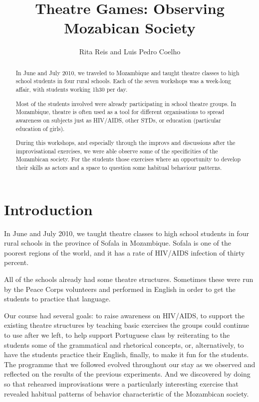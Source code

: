 \documentclass[article,twocolumn,twoside]{memoir}
\title{Theatre Games: Observing Mozabican Society}
\author{Rita Reis and Luis Pedro Coelho}
\begin{document}
\maketitle

\begin{abstract}


In June and July 2010, we traveled to Mozambique and taught theatre classes to
high school students in four rural schools. Each of the seven workshops was a
week-long affair, with students working 1h30 per day.

Most of the students involved were already participating in school theatre
groups. In Mozambique, theatre is often used as a tool for different
organisations to spread awareness on subjects just as HIV/AIDS, other STDs, or
education (particular education of girls).

During this workshops, and especially through the improvs and discussions after
the improvisational exercises, we were able observe some of the specificities
of the Mozambican society. For the students those exercises where an
opportunity to develop their skills as actors and a space to question some
habitual behaviour patterns.

\end{abstract}

\chapter{Introduction}
In June and July 2010, we taught theatre classes to high school students in four
rural schools in the province of Sofala in Mozambique. Sofala is one of the
poorest regions of the world, and it has a rate of HIV/AIDS infection of thirty
percent.

All of the schools already had some theatre structures. Sometimes these were
run by the Peace Corps volunteers and performed in English in order to get the
students to practice that language.

Our course had several goals: to raise awareness on HIV/AIDS, to support the
existing theatre structures by teaching basic exercises the groups could
continue to use after we left, to help support Portuguese class by reiterating
to the students some of the grammatical and rhetorical concepts, or,
alternatively, to have the students practice their English, finally, to make it
fun for the students. The programme that we followed evolved throughout our
stay as we observed and reflected on the results of the previous experiments.
And we discovered by doing so that rehearsed improvisations were a particularly
interesting exercise that revealed habitual patterns of behavior characteristic
of the Mozambican society.
\end{document}
